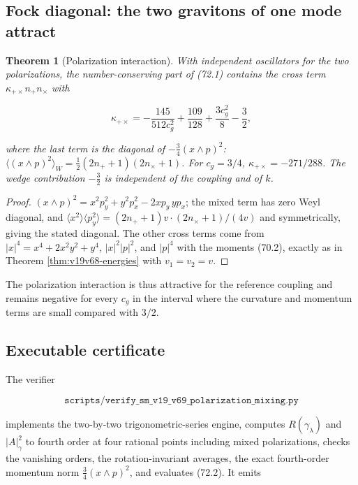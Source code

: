 \documentclass[11pt]{article}
\newtheorem{theorem}{Theorem}[section]
\theoremstyle{remark}
\begin{document}
\subsection{Fock diagonal: the two gravitons of one mode attract}

\begin{theorem}[Polarization interaction]
\label{thm:v19v69-interaction}
With independent oscillators for the two polarizations, the
number-conserving part of (72.1) contains the cross term
\(\kappa_{+\times}n_+n_\times\) with

\[
 \kappa_{+\times}=-\frac{145}{512c_g^2}+\frac{109}{128}+\frac{3c_g^2}{8}-\frac32,
                                                                    \tag{72.2}
\]

where the last term is the diagonal of \(-\tfrac34(x\wedge p)^2\):
\(\langle(x\wedge p)^2\rangle_W=\tfrac12(2n_++1)(2n_\times+1)\).  For
\(c_g=3/4\), \(\kappa_{+\times}=-271/288\).  The wedge contribution
\(-\tfrac32\) is independent of the coupling and of \(k\).
\end{theorem}

\begin{proof}
\((x\wedge p)^2=x^2p_y^2+y^2p_x^2-2xp_y\,yp_x\); the mixed term has
zero Weyl diagonal, and
\(\langle x^2\rangle\langle p_y^2\rangle=(2n_++1)v\cdot(2n_\times+1)/(4v)\)
and symmetrically, giving the stated diagonal.  The other cross terms
come from \(|x|^4=x^4+2x^2y^2+y^4\), \(|x|^2|p|^2\), and \(|p|^4\)
with the moments (70.2), exactly as in Theorem \ref{thm:v19v68-energies}
with \(v_1=v_2=v\).
\end{proof}

The polarization interaction is thus attractive for the reference
coupling and remains negative for every \(c_g\) in the interval where
the curvature and momentum terms are small compared with \(3/2\).

\subsection{Executable certificate}

The verifier

\[
 \texttt{scripts/verify\_sm\_v19\_v69\_polarization\_mixing.py}      \tag{72.3}
\]

implements the two-by-two trigonometric-series engine, computes
\(R(\gamma_\lambda)\) and \(|A|^2_\gamma\) to fourth order at four
rational points including mixed polarizations, checks the vanishing
orders, the rotation-invariant averages, the exact fourth-order
momentum norm \(\tfrac34(x\wedge p)^2\), and evaluates (72.2).  It emits
\end{document}
